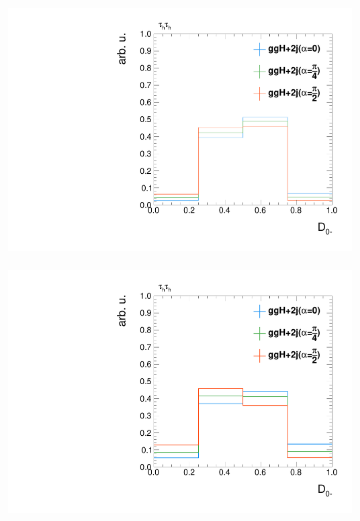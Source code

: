 \begin{figure}[h!]
   \centering
   \begin{subfigure}{.49\textwidth}
       \centering
       \includegraphics[width=\textwidth]{Figures/eventselection/CPHypotheses/JHU_D0Minus_no_cuts.pdf}%
   \end{subfigure}
   \begin{subfigure}{.49\textwidth}
       \centering
       \includegraphics[width=\textwidth]{Figures/eventselection/CPHypotheses/JHU_D0Minus_mjj_cuts.pdf} \\%
   \end{subfigure}
   \begin{subfigure}{.49\textwidth}
       \centering

\end{subfigure}
\end{figure}
